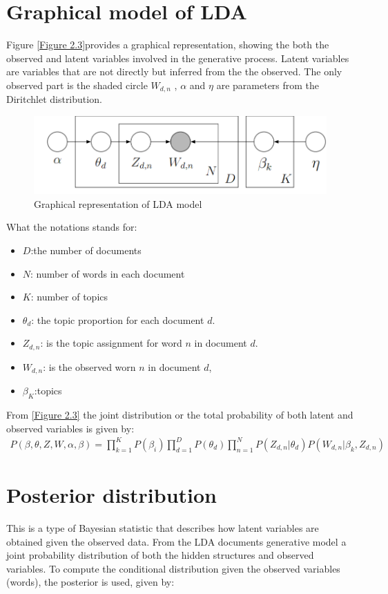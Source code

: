 \section{Graphical model of LDA}
Figure \eqref{Figure 2.3}provides a graphical representation, showing the both the observed and latent variables involved in the generative process. Latent variables are variables that are not directly but inferred from the the observed.
The only observed part is the shaded circle $W_{d,n}$ , $\alpha$ and $\eta$ are parameters from the Diritchlet distribution.
\begin{figure}[hbtp]
\centering
\includegraphics[scale=0.5]{Graphical.png}
\caption{Graphical representation of LDA model} \label{Figure 2.3}
\end{figure}
What the notations stands for:
\begin{itemize}
\item$D$:the number of documents
\item$N$: number of words in each document
\item$K$: number of topics
\item$\theta_d$: the topic proportion for each document $d$.
\item $Z_{d,n}$: is the topic assignment for word $n$ in document $d$.
\item $W_{d,n}$: is the observed worn $n$ in document $d$,
\item $\beta_K$:topics
\end{itemize}
From \eqref{Figure 2.3} the joint  distribution or the total probability of both latent and observed variables is given by:
\begin{align}
P(\beta,\theta,Z,W, \alpha, \beta )=\prod_{k=1}^{K}P(\beta_i)\prod_{d=1}^{D}P(\theta_d)
\prod_{n=1}^{N}P(Z_{d,n}|\theta_d)P(W_{d,n}|\beta_k,Z_{d,n})
\end{align}
\section{Posterior distribution}
This is a type of Bayesian statistic that describes how  latent variables are obtained given the observed data. From the LDA documents generative model a joint probability distribution of both the hidden structures and observed variables. To compute the conditional distribution given the observed variables (words), the posterior is used, given by:

